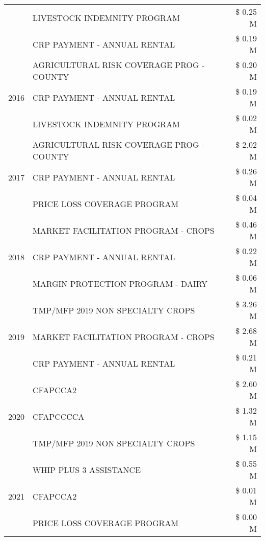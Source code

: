 \begin{tabular}{llr}
 & LIVESTOCK INDEMNITY PROGRAM & \$ 0.25 M \\
 & CRP PAYMENT - ANNUAL RENTAL & \$ 0.19 M \\
\cline{1-3}
\multirow[t]{3}{*}{2016} & AGRICULTURAL RISK COVERAGE PROG - COUNTY & \$ 0.20 M \\
 & CRP PAYMENT - ANNUAL RENTAL & \$ 0.19 M \\
 & LIVESTOCK INDEMNITY PROGRAM & \$ 0.02 M \\
\cline{1-3}
\multirow[t]{3}{*}{2017} & AGRICULTURAL RISK COVERAGE PROG - COUNTY & \$ 2.02 M \\
 & CRP PAYMENT - ANNUAL RENTAL & \$ 0.26 M \\
 & PRICE LOSS COVERAGE PROGRAM & \$ 0.04 M \\
\cline{1-3}
\multirow[t]{3}{*}{2018} & MARKET FACILITATION PROGRAM - CROPS & \$ 0.46 M \\
 & CRP PAYMENT - ANNUAL RENTAL & \$ 0.22 M \\
 & MARGIN PROTECTION PROGRAM - DAIRY & \$ 0.06 M \\
\cline{1-3}
\multirow[t]{3}{*}{2019} & TMP/MFP 2019 NON SPECIALTY CROPS & \$ 3.26 M \\
 & MARKET FACILITATION PROGRAM - CROPS & \$ 2.68 M \\
 & CRP PAYMENT - ANNUAL RENTAL & \$ 0.21 M \\
\cline{1-3}
\multirow[t]{3}{*}{2020} & CFAPCCA2 & \$ 2.60 M \\
 & CFAPCCCCA & \$ 1.32 M \\
 & TMP/MFP 2019 NON SPECIALTY CROPS & \$ 1.15 M \\
\cline{1-3}
\multirow[t]{3}{*}{2021} & WHIP PLUS 3 ASSISTANCE & \$ 0.55 M \\
 & CFAPCCA2 & \$ 0.01 M \\
 & PRICE LOSS COVERAGE PROGRAM & \$ 0.00 M \\
\cline{1-3}
\bottomrule
\end{tabular}
